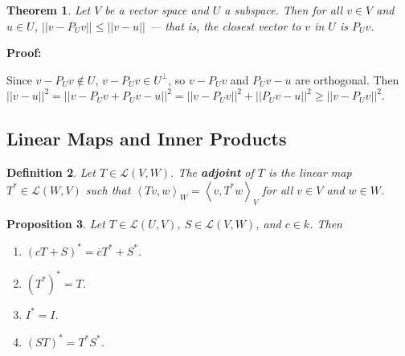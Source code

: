 \documentclass{article}
\theoremstyle{colontheorem}
\newtheorem{theorem}{Theorem}[section]
\newtheorem{proposition}[theorem]{Proposition}
\newtheorem{definition}[theorem]{Definition}
\newenvironment{Theorem}
{
	\begin{mdframed}[backgroundcolor=TheoremOrange!10]
	\begin{theorem}
}
{
	\end{theorem}
	\end{mdframed}
	
	\vspace{.15in}
}
\newenvironment{Proposition}
{
	\begin{mdframed}[backgroundcolor=TheoremOrange!10]
	\begin{proposition}
}
{
	\end{proposition}
	\end{mdframed}
	
	\vspace{.15in}
}
\newenvironment{Def}
{
	\begin{mdframed}[backgroundcolor=DefGreen!10]
	\begin{definition}
}
{
	\end{definition}
	\end{mdframed}
	
	\vspace{.15in}
}
\newenvironment{Proof}
{
	\vspace{-.3in}
	
	\begin{mdframed}[backgroundcolor=ProofPurple!10]
	\textbf{Proof:}%
}
{
	\end{mdframed}
	
	\vspace{.15in}
}
\begin{document}
\begin{Theorem}
	
	Let $V$ be a vector space and $U$ a subspace. Then for all $v \in V$ and $u \in U$, $||v - P_U v|| \leq ||v - u||$ --- that is, the closest vector to $v$ in $U$ is $P_U v$.
	
\end{Theorem}



\begin{Proof}
	Since $v - P_U v \notin U$, $v - P_U v \in U^\perp$, so $v - P_U v$ and $P_U v - u$ are orthogonal. Then $||v - u||^2 = ||v - P_U v + P_U v - u||^2 = ||v - P_U v||^2 + ||P_U v - u||^2 \geq ||v - P_U v||^2$.
	
\end{Proof}





\begin{center}
	\pagebreak
	
	\section{Linear Maps and Inner Products}
	
	\vspace{.1in}
\end{center}



\begin{Def}
	
	Let $T \in \mathcal{L}(V, W)$. The \textbf{adjoint} of $T$ is the linear map $T^* \in \mathcal{L}(W, V)$ such that $\left< Tv, w \right>_W = \left< v, T^*w \right>_V$ for all $v \in V$ and $w \in W$.
	
\end{Def}



\begin{Proposition}
	
	Let $T \in \mathcal{L}(U, V)$, $S \in \mathcal{L}(V, W)$, and $c \in k$. Then
	
	\begin{enumerate}
		
		\item $(cT + S)^* = \overline{c} T^* + S^*$.
		
		\item $(T^*)^* = T$.
		
		\item $I^* = I$.
		
		\item $(ST)^* = T^* S^*$.
		
	\end{enumerate}
	
\end{Proposition}
\end{document}
